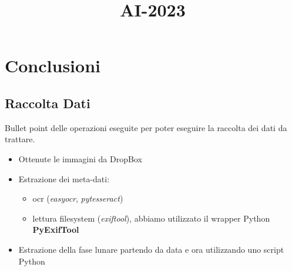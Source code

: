 \title{AI-2023}\documentclass[12pt,a4paper,twoside]{article}
\begin{document}
\section{Conclusioni}

\subsection{Raccolta Dati}
Bullet point delle operazioni eseguite per poter eseguire la raccolta dei dati da trattare.
\begin{itemize}
    \item Ottenute le immagini da DropBox
    \item Estrazione dei meta-dati:
    \begin{itemize}
        \item ocr (\textit{easyocr}, \textit{pytesseract})
        \item lettura filesystem (\textit{exiftool}), abbiamo utilizzato il wrapper Python \textbf{PyExifTool}
    \end{itemize}
    \item Estrazione della fase lunare partendo da data e ora utilizzando uno script Python
\end{itemize}
\end{document}
